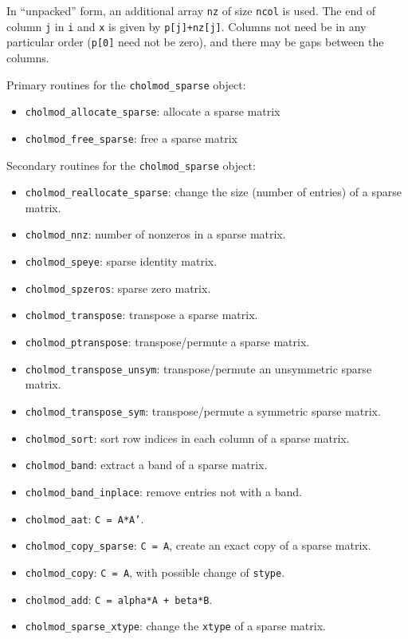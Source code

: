 \documentclass[11pt]{article}
\begin{document}
    In ``unpacked'' form, an additional array {\tt nz} of size {\tt ncol}
    is used.  The end of column {\tt j} in {\tt i} and {\tt x}
    is given by {\tt p[j]+nz[j]}.  Columns not need be in any particular
    order ({\tt p[0]} need not be zero), and there may be gaps between
    the columns.

\vspace{0.1in}
\noindent Primary routines for the {\tt cholmod\_sparse} object:
    \begin{itemize}
    \item {\tt cholmod\_allocate\_sparse}: allocate a sparse matrix
    \item {\tt cholmod\_free\_sparse}: free a sparse matrix
    \end{itemize}

\noindent Secondary routines for the {\tt cholmod\_sparse} object:
    \begin{itemize}
    \item {\tt cholmod\_reallocate\_sparse}: change the size (number of entries) of a sparse matrix.
    \item {\tt cholmod\_nnz}: number of nonzeros in a sparse matrix.
    \item {\tt cholmod\_speye}: sparse identity matrix.
    \item {\tt cholmod\_spzeros}: sparse zero matrix.
    \item {\tt cholmod\_transpose}: transpose a sparse matrix.
    \item {\tt cholmod\_ptranspose}: transpose/permute a sparse matrix.
    \item {\tt cholmod\_transpose\_unsym}: transpose/permute an unsymmetric sparse matrix.
    \item {\tt cholmod\_transpose\_sym}: transpose/permute a symmetric sparse matrix.
    \item {\tt cholmod\_sort}: sort row indices in each column of a sparse matrix.
    \item {\tt cholmod\_band}: extract a band of a sparse matrix.
    \item {\tt cholmod\_band\_inplace}: remove entries not with a band.
    \item {\tt cholmod\_aat}: {\tt C = A*A'}.
    \item {\tt cholmod\_copy\_sparse}: {\tt C = A}, create an exact copy of a sparse matrix.
    \item {\tt cholmod\_copy}: {\tt C = A}, with possible change of {\tt stype}.
    \item {\tt cholmod\_add}: {\tt C = alpha*A + beta*B}.
    \item {\tt cholmod\_sparse\_xtype}: change the {\tt xtype} of a sparse matrix.
    \end{itemize}
\end{document}
